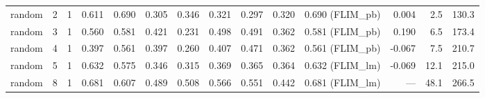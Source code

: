 \begin{tabular}{llrrrrrrrrrrrr}
random & 2 & 1 & 0.611 & 0.690 & 0.305 & 0.346 & 0.321 & 0.297 & 0.320 & 0.690 (FLIM\_pb) & 0.004 & 2.5 & 130.3 \\
random & 3 & 1 & 0.560 & 0.581 & 0.421 & 0.231 & 0.498 & 0.491 & 0.362 & 0.581 (FLIM\_pb) & 0.190 & 6.5 & 173.4 \\
random & 4 & 1 & 0.397 & 0.561 & 0.397 & 0.260 & 0.407 & 0.471 & 0.362 & 0.561 (FLIM\_pb) & -0.067 & 7.5 & 210.7 \\
random & 5 & 1 & 0.632 & 0.575 & 0.346 & 0.315 & 0.369 & 0.365 & 0.364 & 0.632 (FLIM\_lm) & -0.069 & 12.1 & 215.0 \\
random & 8 & 1 & 0.681 & 0.607 & 0.489 & 0.508 & 0.566 & 0.551 & 0.442 & 0.681 (FLIM\_lm) & --- & 48.1 & 266.5 \\
\hline
\end{tabular}
